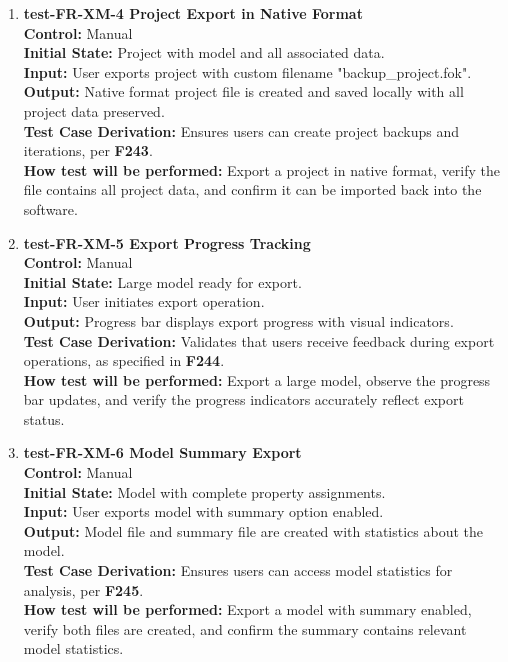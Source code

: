\documentclass[12pt, titlepage]{article}
\begin{document}
\begin{enumerate}
  \item \textbf{test-FR-XM-4 Project Export in Native Format} \\[2mm]
    \textbf{Control:} Manual \\ 
    \textbf{Initial State:} Project with model and all associated data. \\ 
    \textbf{Input:} User exports project with custom filename "backup\_project.fok". \\ 
    \textbf{Output:} Native format project file is created and saved locally with all project data preserved. \\[2mm]
    \textbf{Test Case Derivation:} Ensures users can create project backups and iterations, per \textbf{F243}. \\[2mm]
    \textbf{How test will be performed:} Export a project in native format, verify the file contains all project data, and confirm it can be imported back into the software.

  \item \textbf{test-FR-XM-5 Export Progress Tracking} \\[2mm]
    \textbf{Control:} Manual \\ 
    \textbf{Initial State:} Large model ready for export. \\ 
    \textbf{Input:} User initiates export operation. \\ 
    \textbf{Output:} Progress bar displays export progress with visual indicators. \\[2mm]
    \textbf{Test Case Derivation:} Validates that users receive feedback during export operations, as specified in \textbf{F244}. \\[2mm]
    \textbf{How test will be performed:} Export a large model, observe the progress bar updates, and verify the progress indicators accurately reflect export status.

  \item \textbf{test-FR-XM-6 Model Summary Export} \\[2mm]
    \textbf{Control:} Manual \\ 
    \textbf{Initial State:} Model with complete property assignments. \\ 
    \textbf{Input:} User exports model with summary option enabled. \\ 
    \textbf{Output:} Model file and summary file are created with statistics about the model. \\[2mm]
    \textbf{Test Case Derivation:} Ensures users can access model statistics for analysis, per \textbf{F245}. \\[2mm]
    \textbf{How test will be performed:} Export a model with summary enabled, verify both files are created, and confirm the summary contains relevant model statistics.


\end{enumerate}
\end{document}
